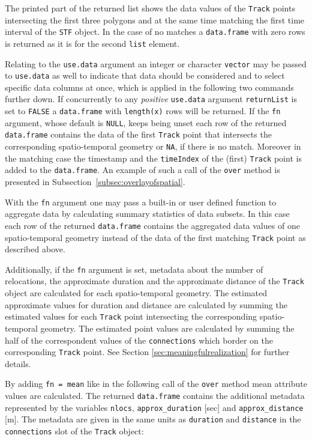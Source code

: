 \documentclass[12pt, oneside, a4paper]{scrbook}
\let\code=\texttt
\begin{document}
The printed part of the returned list shows the data values of the \code{Track} points intersecting the first three polygons and at the same time matching the first time interval of the \code{STF} object. In the case of no matches a \code{data.frame} with zero rows is returned as it is for the second \code{list} element.
\par\medskip
Relating to the \code{use.data} argument an integer or character \code{vector} may be passed to \code{use.data} as well to indicate that data should be considered and to select specific data columns at once, which is applied in the following two commands further down.
If concurrently to any \textit{positive} \code{use.data} argument \code{returnList} is set to \code{FALSE} a \code{data.frame} with \code{length(x)} rows will be returned. 
If the \code{fn} argument, whose default is \code{NULL}, keeps being unset each row of the returned \code{data.frame} contains the data of the first \code{Track} point that intersects the corresponding spatio-temporal geometry or \code{NA}, if there is no match. Moreover in the matching case the timestamp and the \code{timeIndex} of the (first) \code{Track} point is added to the \code{data.frame}. An example of such a call of the \code{over} method is presented in Subsection~\ref{subsec:overlayofspatial}.
\par\medskip
With the \code{fn} argument one may pass a built-in or user defined function to aggregate data by calculating summary statistics of data subsets.
In this case each row of the returned \code{data.frame} contains the aggregated data values of one spatio-temporal geometry instead of the data of the first matching \code{Track} point as described above.
\par\medskip
Additionally, if the \code{fn} argument is set, metadata about the number of relocations, the approximate duration and the approximate distance of the \code{Track} object are calculated for each spatio-temporal geometry. The estimated approximate values for duration and distance are calculated by summing the estimated values for each \code{Track} point intersecting the corresponding spatio-temporal geometry. The estimated point values are calculated by summing the half of the correspondent values of the \code{connections} which border on the corresponding \code{Track} point. See Section \ref{sec:meaningfulrealization} for further details.
\par\medskip

By adding \code{fn = mean} like in the following call of the \code{over} method mean attribute values are calculated. The returned \code{data.frame} contains the additional metadata represented by the variables \code{nlocs}, \code{approx\_duration} [sec] and \code{approx\_distance} [m]. The metadata are given in the same units as \code{duration} and \code{distance} in the \code{connections} slot of the \code{Track} object:
\end{document}
